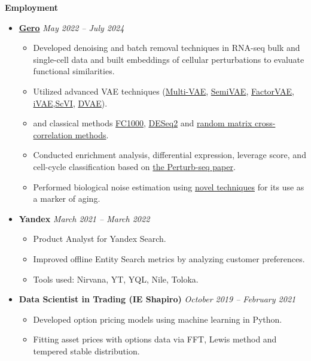 \documentclass[12pt]{article}
\begin{document}
\noindent \textbf{\Large Employment}
\begin{itemize}
    \item \href{https://gero.ai/}{\textbf{Gero}} \hfill \textit{May 2022 -- July 2024}
    \begin{itemize}
        \item Developed denoising and batch removal techniques in RNA-seq bulk and single-cell data and built embeddings of cellular perturbations to evaluate functional similarities.
        \item Utilized advanced VAE techniques (\href{https://openaccess.thecvf.com/content/ICCV2021/papers/Xu_Multi-VAE_Learning_Disentangled_View-Common_and_View-Peculiar_Visual_Representations_for_Multi-View_ICCV_2021_paper.pdf}{Multi-VAE}, \href{https://arxiv.org/abs/1603.02514}{SemiVAE}, \href{https://arxiv.org/abs/1802.05983}{FactorVAE}, \href{https://arxiv.org/abs/1907.04809}{iVAE},\href{https://docs.scvi-tools.org/en/stable/api/reference/scvi.model.SCVI.html#scvi.model.SCVI}{ScVI}, \href{https://arxiv.org/abs/1509.05982}{DVAE}).
        \item and classical methods \href{https://www.degruyter.com/document/doi/10.1515/sagmb-2016-0072/html}{FC1000}, \href{https://genomebiology.biomedcentral.com/articles/10.1186/s13059-014-0550-8}{DESeq2} and \href{https://arxiv.org/abs/cond-mat/0108023}{random matrix cross-correlation methods}. 
        \item Conducted enrichment analysis, differential expression, leverage score, and cell-cycle classification 
              based on \href{https://pubmed.ncbi.nlm.nih.gov/35688146/}{the Perturb-seq paper}.
        \item Performed biological noise estimation using \href{https://www.biorxiv.org/content/10.1101/2022.06.23.497402v1}{novel techniques} for its use as a marker of aging.
    \end{itemize}

    \item \textbf{Yandex} \hfill \textit{March 2021 -- March 2022}
    \begin{itemize}
        \item Product Analyst for Yandex Search.
        \item Improved offline Entity Search metrics by analyzing customer preferences.
        \item Tools used: Nirvana, YT, YQL, Nile, Toloka.
    \end{itemize}

    \item \textbf{Data Scientist in Trading (IE Shapiro)} \hfill \textit{October 2019 -- February 2021}
    \begin{itemize}
        \item Developed option pricing models using machine learning in Python.
        \item Fitting asset prices with options data via FFT, Lewis method and tempered stable distribution.

    \end{itemize}

\end{itemize}
\end{document}
